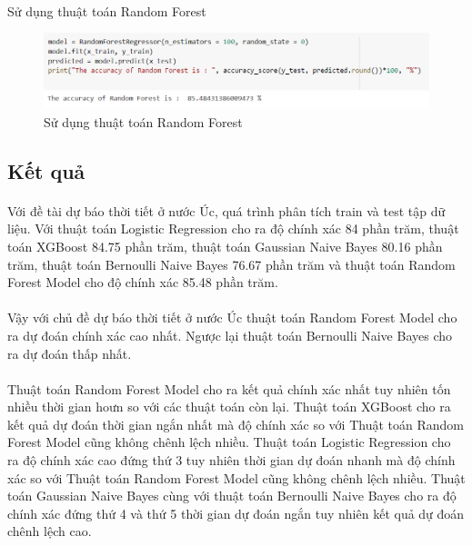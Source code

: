\documentclass{article}
\begin{document}
\paragraph{}Sử dụng thuật toán Random Forest
\begin{figure}[!h]
	\begin{center}
		\includegraphics[width=\linewidth]{images/code33.png}
		\caption{\fontsize{14}{20}\selectfont Sử dụng thuật toán Random Forest}
	\end{center}
\end{figure}
\pagebreak
 \subsection{Kết quả}
\paragraph{}
Với đề tài dự báo thời tiết ở nước Úc, quá trình phân tích train và test tập dữ liệu. Với thuật toán Logistic Regression cho ra độ chính xác 84 phần trăm, thuật toán XGBoost 84.75 phần trăm, thuật toán Gaussian Naive Bayes 80.16 phần trăm, thuật toán Bernoulli Naive Bayes 76.67 phần trăm và thuật toán Random Forest Model cho độ chính xác 85.48 phần trăm.
\paragraph{}Vậy với chủ đề dự báo thời tiết ở nước Úc thuật toán Random Forest Model cho ra dự đoán chính xác cao nhất. Ngược lại thuật toán Bernoulli Naive Bayes cho ra dự đoán thấp nhất.
\paragraph{}Thuật toán Random Forest Model cho ra kết quả chính xác nhất tuy nhiên tốn nhiều thời gian hoưn so với các thuật toán còn lại. Thuật toán XGBoost cho ra kết quả dự đoán thời gian ngắn nhất mà độ chính xác so với Thuật toán Random Forest Model cũng không chênh lệch nhiều.  Thuật toán Logistic Regression cho ra độ chính xác cao đứng thứ 3 tuy nhiên thời gian dự đoán nhanh mà độ chính xác so với Thuật toán Random Forest Model cũng không chênh lệch nhiều. Thuật toán Gaussian Naive Bayes cùng với thuật toán Bernoulli Naive Bayes cho ra độ chính xác đứng thứ 4 và thứ 5 thời gian dự đoán ngắn tuy nhiên kết quả dự đoán chênh lệch cao.
\pagebreak
\end{document}
